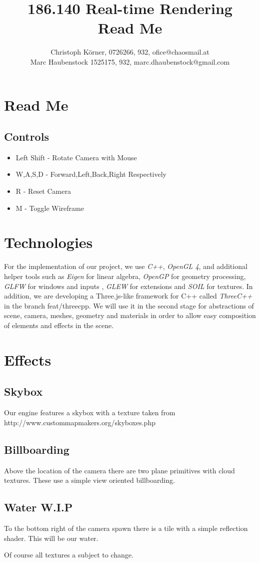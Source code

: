 \documentclass[11pt,a4paper]{article}
\author{Christoph Körner, 0726266, 932, ofice@chaosmail.at\\Marc Haubenstock 1525175, 932, marc.dhaubenstock@gmail.com}
\title{186.140 Real-time Rendering\\Read Me}
\begin{document}
\maketitle

\section{Read Me}

\subsection{Controls}

\begin{itemize}
\item Left Shift - Rotate Camera with Mouse
\item W,A,S,D - Forward,Left,Back,Right Respectively
\item R - Reset Camera
\item M - Toggle Wireframe
\end{itemize} 

\section{Technologies}

For the implementation of our project, we use \textit{C++}, \textit{OpenGL 4}, and additional helper tools such as \textit{Eigen} for linear algebra, \textit{OpenGP} for geometry processing, \textit{GLFW} for windows and inputs , \textit{GLEW} for extensions and \textit{SOIL} for textures. In addition, we are developing a Three.js-like framework for C++ called \textit{ThreeC++} in the branch \textsf{feat/threecpp}. We will use it in the second stage for abstractions of scene, camera, meshes, geometry and materials in order to allow easy composition of elements and effects in the scene.

\section{Effects}

\subsection{Skybox}

Our engine features a skybox with a texture taken from \newline
http://www.custommapmakers.org/skyboxes.php

\subsection{Billboarding}

Above the location of the camera there are two plane primitives with cloud textures.
These use a simple view oriented billboarding. 

\subsection{Water W.I.P}
To the bottom right of the camera spawn there is a tile with a simple reflection shader. This will be our water.

Of course all textures a subject to change.
\end{document}
